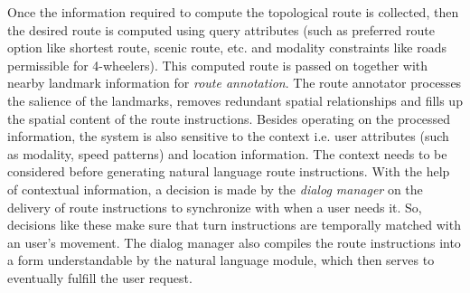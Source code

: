 \documentclass{iitkthesis}
\begin{document}
Once the information required to compute the topological route is 
collected, then the desired route is computed using query attributes 
(such as preferred route option like shortest route, scenic route, etc. 
and modality constraints like roads permissible for 4-wheelers). This 
computed route is passed on together with nearby landmark information for 
\textit{route annotation}. The route annotator processes the salience of 
the landmarks, removes redundant spatial relationships and fills up the 
spatial content of the route instructions. Besides operating on the 
processed information, the system is also sensitive to the context i.e. 
user attributes (such as modality, speed patterns) and location 
information. The context needs to be considered before generating natural 
language route instructions. With the help of contextual information, a 
decision is made by the \textit{dialog manager} on the delivery of route 
instructions to synchronize with when a user needs it. So, 
decisions like these make sure that turn instructions are temporally 
matched with an user's movement. The dialog manager also compiles the route 
instructions into a form understandable by the natural language module, 
which then serves to eventually fulfill the user request.
\end{document}
